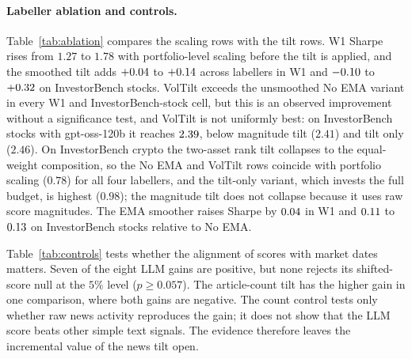 \paragraph{Labeller ablation and controls.}
Table~\ref{tab:ablation} compares the scaling rows with the tilt rows. W1 Sharpe rises from $1.27$ to $1.78$ with portfolio-level scaling before the tilt is applied, and the smoothed tilt adds $+0.04$ to $+0.14$ across labellers in W1 and $-0.10$ to $+0.32$ on InvestorBench stocks. VolTilt exceeds the unsmoothed No EMA variant in every W1 and InvestorBench-stock cell, but this is an observed improvement without a significance test, and VolTilt is not uniformly best: on InvestorBench stocks with gpt-oss-120b it reaches $2.39$, below magnitude tilt ($2.41$) and tilt only ($2.46$). On InvestorBench crypto the two-asset rank tilt collapses to the equal-weight composition, so the No EMA and VolTilt rows coincide with portfolio scaling ($0.78$) for all four labellers, and the tilt-only variant, which invests the full budget, is highest ($0.98$); the magnitude tilt does not collapse because it uses raw score magnitudes. The EMA smoother raises Sharpe by $0.04$ in W1 and $0.11$ to $0.13$ on InvestorBench stocks relative to No EMA.

Table~\ref{tab:controls} tests whether the alignment of scores with market dates matters. Seven of the eight LLM gains are positive, but none rejects its shifted-score null at the $5\%$ level ($p\geq0.057$). The article-count tilt has the higher gain in one comparison, where both gains are negative. The count control tests only whether raw news activity reproduces the gain; it does not show that the LLM score beats other simple text signals. The evidence therefore leaves the incremental value of the news tilt open.

